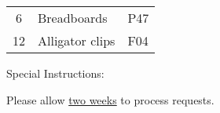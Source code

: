 \documentclass{article}
\begin{document}
\begin{center}
\begin{tabular}{|c|p{2.5in}|l|}
6 & 
Breadboards & 
\begin{minipage}{1.0in} 
\raggedright 
\vspace{1ex}
P47 \par
\vspace{1ex}
\end{minipage}
\\

12 & 
Alligator clips & 
\begin{minipage}{1.0in} 
\raggedright 
\vspace{1ex}
F04 \par
\vspace{1ex}
\end{minipage}
\\

\hline
\end{tabular}

\end{center}

\vspace{0.2in}

Special Instructions: \par



\underline{\makebox[\textwidth]{\textbf{}}} \par

\underline{\makebox[\textwidth]{\textbf{}}} \par

\underline{\makebox[\textwidth]{\textbf{}}} \par

\vspace{0.2in}

Please allow \underline{two weeks} to process requests.
\end{document}
